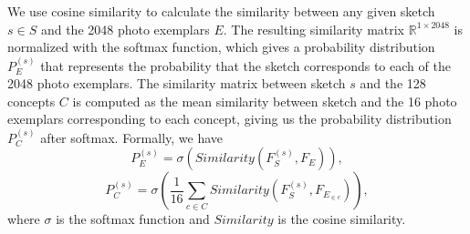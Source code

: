 \documentclass[10pt,letterpaper]{article}
\begin{document}
We use cosine similarity to calculate the similarity between any given sketch $s\in S$ and the 2048 photo exemplars $E$. The resulting similarity matrix $\mathbb{R}^{1 \times 2048}$ is normalized with the softmax function, which gives a probability distribution $P_{E}^{(s)}$ that represents the probability that the sketch corresponds to each of the 2048 photo exemplars. 
The similarity matrix between sketch $s$ and the 128 concepts $C$ is computed as the mean similarity between sketch and the 16 photo exemplars corresponding to each concept, giving us the probability distribution $P_{C}^{(s)}$ after softmax.
Formally, we have
\begin{equation}\label{eq:p exemplar}
    P_{E}^{(s)} = \sigma (Similarity(F_{S}^{(s)}, F_{E})),
\end{equation}
\begin{equation}\label{eq:p concept}
    P_{C}^{(s)} = \sigma (\frac{1}{16} \sum_{c\in C}Similarity(F_{S}^{(s)}, F_{E_{\in c}})),
\end{equation}
where $\sigma$ is the softmax function and $Similarity$ is the cosine similarity.





\end{document}
